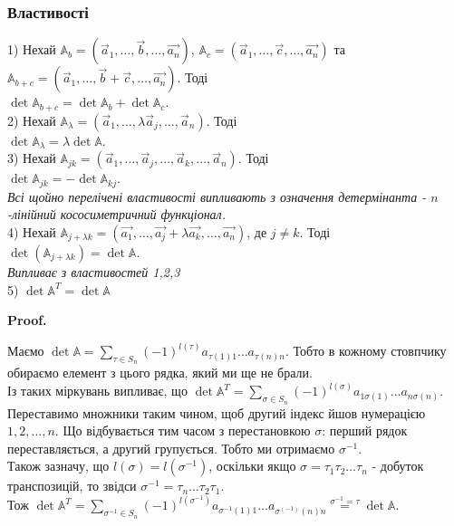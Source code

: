 \documentclass[a4paper, 10pt]{article}
\makeatletter
\theoremstyle{theoremdd}
\renewenvironment{proof}[1][Proof.\\]{\par
\pushQED{\hfill \qed}%
\normalfont \topsep6\p@\@plus6\p@\relax
\trivlist
\item\relax
{\bfseries
#1\@addpunct{.}}\hspace\labelsep\ignorespaces
}{%
\popQED\endtrivlist\@endpefalse
}
\makeatother
\begin{document}
\subsubsection*{Властивості}
1) Нехай $\mathbb{A}_b = (\vec{a}_1, \dots, \vec{b}, \dots, \vec{a_n})$, $\mathbb{A}_c = (\vec{a}_1, \dots, \vec{c}, \dots, \vec{a_n})$ та $\mathbb{A}_{b+c} = (\vec{a}_1, \dots, \vec{b}+\vec{c}, \dots, \vec{a_n})$. Тоді\\
$\det \mathbb{A}_{b+c} = \det \mathbb{A}_b + \det \mathbb{A}_{c}$.
\bigskip \\
2) Нехай $\mathbb{A}_{\lambda} = (\vec{a}_1, \dots, \lambda \vec{a}_j, \dots, \vec{a}_n)$. Тоді\\
$\det \mathbb{A}_{\lambda} = \lambda \det \mathbb{A}$.
\bigskip \\
3) Нехай $\mathbb{A}_{jk} = (\vec{a}_1, \dots, \vec{a}_j, \dots, \vec{a}_k, \dots, \vec{a}_n)$. Тоді \\
$\det \mathbb{A}_{jk} = - \det \mathbb{A}_{kj}$.\\
\textit{Всі щойно перелічені властивості випливають з означення детермінанта - $n$-лінійний кососиметричний функціонал.}
\bigskip \\
4) Нехай $\mathbb{A}_{j + \lambda k} = (\vec{a_1},\dots, \vec{a_j} + \lambda \vec{a_k}, \dots, \vec{a_n})$, де $j \neq k$. Тоді\\
$\det (\mathbb{A}_{j + \lambda k}) = \det \mathbb{A}$.\\
\textit{Випливає з властивостей 1,2,3}
\bigskip \\
5) $\det \mathbb{A}^T = \det \mathbb{A}$
\begin{proof}
Маємо $\det \mathbb{A} = \displaystyle\sum_{\tau \in S_n} (-1)^{l(\tau)}a_{\tau(1)1}\dots a_{\tau(n)n}$. Тобто в кожному стовпчику обираємо елемент з цього рядка, який ми ще не брали.\\
Із таких міркувань випливає, що $\det \mathbb{A}^T = \displaystyle\sum_{\sigma \in S_n} (-1)^{l(\sigma)}a_{1 \sigma(1)}\dots a_{n \sigma(n)}$.\\
Переставимо множники таким чином, щоб другий індекс йшов нумерацією $1,2,\dots,n$. Що відбувається тим часом з перестановкою $\sigma$: перший рядок переставляється, а другий групується. Тобто ми отримаємо $\sigma^{-1}$.\\
Також зазначу, що $l(\sigma) = l(\sigma^{-1})$, оскільки якщо $\sigma = \tau_1 \tau_2 \dots \tau_n$ - добуток транспозицій, то звідси $\sigma^{-1} = \tau_n \dots \tau_2 \tau_1$.\\
Тож $\det \mathbb{A}^T = \displaystyle\sum_{\sigma^{-1} \in S_n} (-1)^{l(\sigma^{-1})} a_{\sigma^{-1}(1)1}\dots a_{\sigma^{(-1)}(n)n} \overset{\sigma^{-1} = \tau}{=} \det \mathbb{A}$.
\end{proof}
\end{document}
